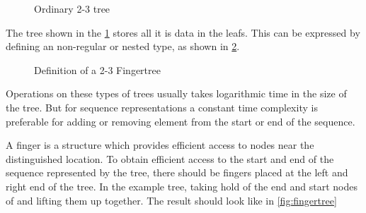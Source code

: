 \begin{figure}[!h]
\centering
{}
\caption{Ordinary 2-3 tree
\label{fig:2-3tree}}
\end{figure}

The tree shown in the \cref{fig:2-3tree} stores all it is data in the leafs.
This can be expressed by defining an non-regular or nested type, as shown in
\cref{fig:2-3Fingertree}.

\begin{figure}[h!]

\caption{Definition of a 2-3 Fingertree \label{fig:2-3Fingertree}}
\end{figure}

Operations on these types of trees usually takes logarithmic time in the size of
the tree. But for sequence representations a constant time complexity is
preferable for adding or removing element from the start or end of the sequence.

A finger is a structure which provides efficient access to nodes near the
distinguished location. To obtain efficient access to the start and end of the
sequence represented by the tree, there should be fingers placed at the left and
right end of the tree. In the example tree, taking hold of the end and start
nodes of and lifting them up together. The result should look like in
\cref{fig:fingertree}

